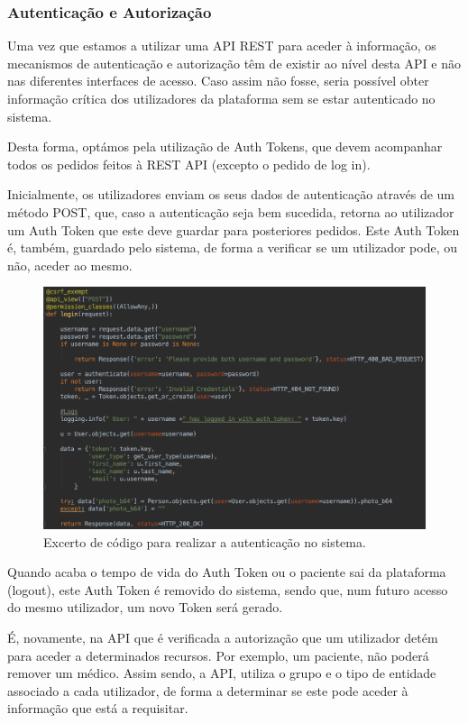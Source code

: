 \documentclass{TTUPhD}
\begin{document}
\subsubsection{Autenticação e Autorização}
\label{sec:auth}

Uma vez que estamos a utilizar uma API REST para aceder à informação, os mecanismos de autenticação e autorização têm de existir ao nível desta API e não nas diferentes interfaces de acesso. Caso assim não fosse, seria possível obter informação crítica dos utilizadores da plataforma sem se estar autenticado no sistema.

Desta forma, optámos pela utilização de Auth Tokens, que devem acompanhar todos os pedidos feitos à REST API (excepto o pedido de log in).

Inicialmente, os utilizadores enviam os seus dados de autenticação através de um método POST, que, caso a autenticação seja bem sucedida, retorna ao utilizador um Auth Token que este deve guardar para posteriores pedidos. Este Auth Token é, também, guardado pelo sistema, de forma a verificar se um utilizador pode, ou não, aceder ao mesmo.

\begin{figure}[h!]
    \center
    \includegraphics[scale=0.43]{./img/rest3.png}
    \caption{Excerto de código para realizar a autenticação no sistema.}
    \label{fig:rest3}
\end{figure}

Quando acaba o tempo de vida do Auth Token ou o paciente sai da plataforma (logout), este Auth Token é removido do sistema, sendo que, num futuro acesso do mesmo utilizador, um novo Token será gerado.

É, novamente, na API que é verificada a autorização que um utilizador detém para aceder a determinados recursos. Por exemplo, um paciente, não poderá remover um médico.
Assim sendo, a API, utiliza o grupo e o tipo de entidade associado a cada utilizador, de forma a determinar se este pode aceder à informação que está a requisitar.
\end{document}
